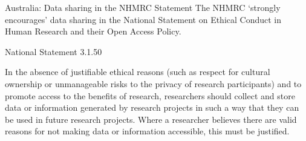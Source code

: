 \documentclass[aspectratio=169, 11pt]{beamer} %
\begin{document}
\begin{frame}{Australia: Data sharing in the NHMRC Statement}
    The NHMRC `strongly encourages' data sharing in the National Statement on Ethical Conduct in Human Research and their Open Access Policy. \cite{Nhmrc2018-sj, Nhmrc2018-vn} \par
    National Statement 3.1.50 \par
    In the absence of justifiable ethical reasons (such as respect for cultural ownership or unmanageable risks to the privacy of research participants) and to promote access to the benefits of research, researchers should collect and store data or information generated by research projects in such a way that they can be used in future research projects. Where a researcher believes there are valid reasons for not making data or information accessible, this must be justified.
\end{frame}
\end{document}
